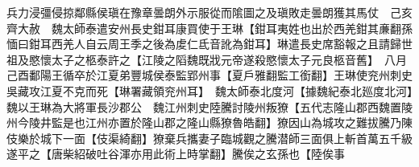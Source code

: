 兵力浸彊侵掠鄰縣侯瑱在豫章曇朗外示服從而隂圖之及瑱敗走曇朗獲其馬仗　己亥齊大赦　魏太師泰遣安州長史鉗耳康買使于王琳【鉗耳夷姓也出於西羌鉗其亷翻孫愐曰鉗耳西羌人自云周王季之後為䖍仁氐音訛為鉗耳】琳遣長史席豁報之且請歸世祖及愍懷太子之柩泰許之【江陵之䧟魏既戕元帝遂殺愍懷太子元良柩音舊】　八月己酉鄱陽王循卒於江夏弟豐城侯泰監郢州事【夏戶雅翻監工銜翻】王琳使兖州刺史吳藏攻江夏不克而死【琳署藏領兖州耳】　魏太師泰北度河【據魏紀泰北廵度北河】　魏以王琳為大將軍長沙郡公　魏江州刺史陸騰討陵州叛獠【五代志隆山郡西魏置陵州今陵井監是也江州亦置於隆山郡之隆山縣獠魯皓翻】獠因山為城攻之難拔騰乃陳伎樂於城下一面【伎渠綺翻】獠棄兵攜妻子臨城觀之騰潜師三面俱上斬首萬五千級遂平之【唐柴紹破吐谷渾亦用此術上時掌翻】騰俟之玄孫也【陸俟事